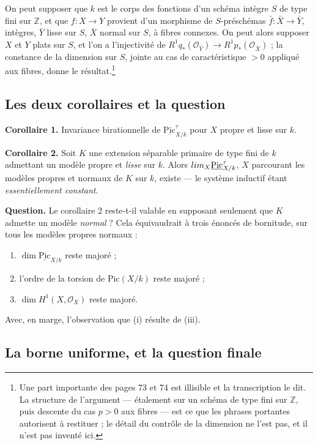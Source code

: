 \documentclass[11pt,a4paper]{article}
\begin{document}
On peut supposer que $k$ est le corps des fonctions d'un schéma intègre $S$ de
type fini sur $\mathbb{Z}$, et que $f : X \to Y$ provient d'un morphisme de
$S$-préschémas $\bar{f} : \bar{X} \to \bar{Y}$, intègres, $\bar{Y}$ lisse sur
$S$, $\bar{X}$ normal sur $S$, à fibres connexes. On peut alors supposer $X$ et
$Y$ plats sur $S$, et l'on a l'injectivité de
$R^{1}q_{*}(\mathcal{O}_{\bar{Y}}) \to R^{1}p_{*}(\mathcal{O}_{\bar{X}})$ ; la
constance de la dimension sur $S$, jointe au cas de caractéristique $> 0$
appliqué aux fibres, donne le résultat.\footnote{Une part importante des pages
73 et 74 est illisible et la transcription le dit. La structure de l'argument
--- étalement sur un schéma de type fini sur $\mathbb{Z}$, puis descente du cas
$p > 0$ aux fibres --- est ce que les phrases portantes autorisent à
restituer ; le détail du contrôle de la dimension ne l'est pas, et il n'est pas
inventé ici.}

\subsection*{Les deux corollaires et la question}

\textbf{Corollaire 1.} Invariance birationnelle de
$\underline{\mathrm{Pic}}^{\tau}_{X/k}$ pour $X$ propre et lisse sur $k$.

\textbf{Corollaire 2.} Soit $K$ une extension séparable primaire de type fini
de $k$ admettant un modèle propre et \emph{lisse} sur $k$. Alors
$\varinjlim_{X} \underline{\mathrm{Pic}}^{\tau}_{X/k}$, $X$ parcourant les
modèles propres et normaux de $K$ sur $k$, existe --- le système inductif étant
\emph{essentiellement constant}.

\textbf{Question.} Le corollaire 2 reste-t-il valable en supposant seulement
que $K$ admette un modèle \emph{normal} ? Cela équivaudrait à trois énoncés de
bornitude, sur tous les modèles propres normaux :
\begin{enumerate}
  \item $\dim \underline{\mathrm{Pic}}_{X/k}$ reste majoré ;
  \item l'ordre de la torsion de $\mathrm{Pic}(X/k)$ reste majoré ;
  \item $\dim H^{1}(X, \mathcal{O}_{X})$ reste majoré.
\end{enumerate}
Avec, en marge, l'observation que (i) résulte de (iii).

\subsection*{La borne uniforme, et la question finale}
\end{document}
